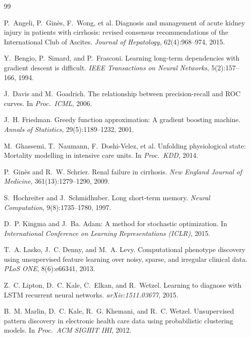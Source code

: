 \documentclass{article}
\begin{document}
\begin{thebibliography}{99}
\small

P.~Angeli, P.~Gin\`es, F.~Wong, et al.
\newblock Diagnosis and management of acute kidney injury in patients with
cirrhosis: revised consensus recommendations of the International Club of Ascites.
\newblock \emph{Journal of Hepatology}, 62(4):968--974, 2015.

Y.~Bengio, P.~Simard, and P.~Frasconi.
\newblock Learning long-term dependencies with gradient descent is difficult.
\newblock \emph{IEEE Transactions on Neural Networks}, 5(2):157--166, 1994.

J.~Davis and M.~Goadrich.
\newblock The relationship between precision-recall and ROC curves.
\newblock In \emph{Proc.\ ICML}, 2006.

J.~H. Friedman.
\newblock Greedy function approximation: A gradient boosting machine.
\newblock \emph{Annals of Statistics}, 29(5):1189--1232, 2001.

M.~Ghassemi, T.~Naumann, F.~Doshi-Velez, et al.
\newblock Unfolding physiological state: Mortality modelling in intensive care
units.
\newblock In \emph{Proc.\ KDD}, 2014.

P.~Gin\`es and R.~W. Schrier.
\newblock Renal failure in cirrhosis.
\newblock \emph{New England Journal of Medicine}, 361(13):1279--1290, 2009.

S.~Hochreiter and J.~Schmidhuber.
\newblock Long short-term memory.
\newblock \emph{Neural Computation}, 9(8):1735--1780, 1997.

D.~P. Kingma and J.~Ba.
\newblock Adam: A method for stochastic optimization.
\newblock In \emph{International Conference on Learning Representations (ICLR)}, 2015.

T.~A. Lasko, J.~C. Denny, and M.~A. Levy.
\newblock Computational phenotype discovery using unsupervised feature learning
over noisy, sparse, and irregular clinical data.
\newblock \emph{PLoS ONE}, 8(6):e66341, 2013.

Z.~C. Lipton, D.~C. Kale, C.~Elkan, and R.~Wetzel.
\newblock Learning to diagnose with LSTM recurrent neural networks.
\newblock \emph{arXiv:1511.03677}, 2015.

B.~M. Marlin, D.~C. Kale, R.~G. Khemani, and R.~C. Wetzel.
\newblock Unsupervised pattern discovery in electronic health care data using
probabilistic clustering models.
\newblock In \emph{Proc.\ ACM SIGHIT IHI}, 2012.


\end{thebibliography}
\end{document}
